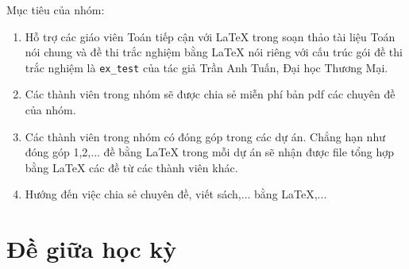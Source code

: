 \documentclass[12pt,a4paper,oneside]{book}
\begin{document}
	\vspace{0.6cm}
	
	\noindent Mục tiêu của nhóm: 
	\begin{enumerate}
		\item Hỗ trợ các giáo viên Toán tiếp cận với \LaTeX{} trong soạn thảo tài liệu Toán nói chung và đề thi trắc nghiệm bằng \LaTeX{} nói riêng với cấu trúc gói đề thi trắc nghiệm là \texttt{ex\_test} của tác giả Trần Anh Tuấn, Đại học Thương Mại.
		\item Các thành viên trong nhóm sẽ được chia sẻ miễn phí bản pdf  các chuyên đề của nhóm.
		\item Các thành viên trong nhóm có đóng góp trong các dự án. Chẳng hạn như đóng góp 1,2,... đề bằng \LaTeX{} trong mỗi dự án sẽ nhận được file tổng hợp bằng \LaTeX{} các đề từ các thành viên khác.
		\item Hướng đến việc chia sẻ chuyên đề, viết sách,... bằng \LaTeX,...
	\end{enumerate}
\chapter{Đề giữa học kỳ}
		
		
\newpage	
\newpage	
\newpage	
\newpage	
\newpage	
\newpage	
\newpage	
\newpage	
\newpage	
\newpage		
\newpage	%
\newpage	
\newpage	
\newpage	
\newpage	
\newpage	%
\newpage	
\newpage	
\newpage	%
\newpage	
\newpage	
\newpage	
\newpage	
\newpage	
\newpage	%
\newpage	
\newpage	
\newpage	
\newpage	
\end{document}
